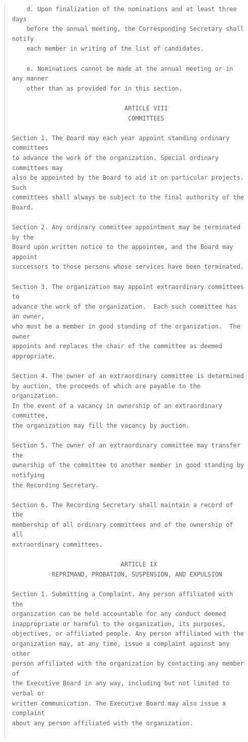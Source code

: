 \documentclass{article}
\begin{document}
\begin{quote}
\begin{verbatim}
    d. Upon finalization of the nominations and at least three days
    before the annual meeting, the Corresponding Secretary shall notify
    each member in writing of the list of candidates.

    e. Nominations cannot be made at the annual meeting or in any manner
    other than as provided for in this section.

                               ARTICLE VIII
                                COMMITTEES

Section 1. The Board may each year appoint standing ordinary committees
to advance the work of the organization. Special ordinary committees may
also be appointed by the Board to aid it on particular projects. Such
committees shall always be subject to the final authority of the Board.

Section 2. Any ordinary committee appointment may be terminated by the
Board upon written notice to the appointee, and the Board may appoint
successors to those persons whose services have been terminated.

Section 3. The organization may appoint extraordinary committees to
advance the work of the organization.  Each such committee has an owner,
who must be a member in good standing of the organization.  The owner
appoints and replaces the chair of the committee as deemed appropriate.

Section 4. The owner of an extraordinary committee is determined
by auction, the proceeds of which are payable to the organization.
In the event of a vacancy in ownership of an extraordinary committee,
the organization may fill the vacancy by auction.

Section 5. The owner of an extraordinary committee may transfer the
ownership of the committee to another member in good standing by notifying
the Recording Secretary.

Section 6. The Recording Secretary shall maintain a record of the
membership of all ordinary committees and of the ownership of all
extraordinary committees.

                              ARTICLE IX
           REPRIMAND, PROBATION, SUSPENSION, AND EXPULSION

Section 1. Submitting a Complaint. Any person affiliated with the
organization can be held accountable for any conduct deemed
inappropriate or harmful to the organization, its purposes,
objectives, or affiliated people. Any person affiliated with the
organization may, at any time, issue a complaint against any other
person affiliated with the organization by contacting any member of
the Executive Board in any way, including but not limited to verbal or
written communication. The Executive Board may also issue a complaint
about any person affiliated with the organization.


\end{verbatim}
\end{quote}
\end{document}

